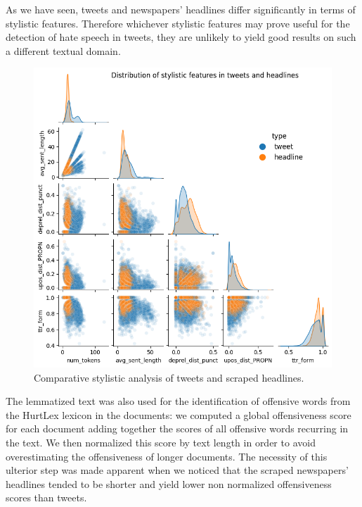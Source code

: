 As we have seen, tweets and newspapers' headlines differ significantly in terms of stylistic features.
Therefore whichever stylistic features may prove useful for the detection of hate speech in tweets, they are unlikely to yield good results on such a different textual domain.

\begin{figure}
    \includegraphics[width=\columnwidth]{../../results/images/style.png}
    \caption{Comparat{}ive stylistic analysis of tweets and scraped headlines.}
    \label{fig:style}
\end{figure}

The lemmatized text was also used for the identification of offensive words from the HurtLex lexicon in the documents: we computed a global offensiveness score for each document adding together the scores of all offensive words recurring in the text.
We then normalized this score by text length in order to avoid overestimating the offensiveness of longer documents.
The necessity of this ulterior step was made apparent when we noticed that the scraped newspapers' headlines tended to be shorter and yield lower non normalized offensiveness scores than tweets.